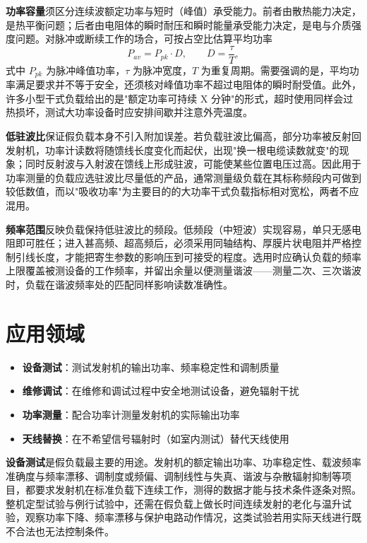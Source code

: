 \textbf{功率容量}须区分连续波额定功率与短时（峰值）承受能力。前者由散热能力决定，是热平衡问题；后者由电阻体的瞬时耐压和瞬时能量承受能力决定，是电与介质强度问题。对脉冲或断续工作的场合，可按占空比估算平均功率
\[
P_{av} = P_{pk} \cdot D, \qquad D = \frac{\tau}{T},
\]
式中 $P_{pk}$ 为脉冲峰值功率，$\tau$ 为脉冲宽度，$T$ 为重复周期。需要强调的是，平均功率满足要求并不等于安全，还须核对峰值功率不超过电阻体的瞬时耐受值。此外，许多小型干式负载给出的是"额定功率可持续 X 分钟"的形式，超时使用同样会过热损坏，测试大功率设备时应安排间歇并注意外壳温度。

\textbf{低驻波比}保证假负载本身不引入附加误差。若负载驻波比偏高，部分功率被反射回发射机，功率计读数将随馈线长度变化而起伏，出现"换一根电缆读数就变"的现象；同时反射波与入射波在馈线上形成驻波，可能使某些位置电压过高。因此用于功率测量的负载应选驻波比尽量低的产品，通常测量级负载在其标称频段内可做到较低数值，而以"吸收功率"为主要目的的大功率干式负载指标相对宽松，两者不应混用。

\textbf{频率范围}反映负载保持低驻波比的频段。低频段（中短波）实现容易，单只无感电阻即可胜任；进入甚高频、超高频后，必须采用同轴结构、厚膜片状电阻并严格控制引线长度，才能把寄生参数的影响压到可接受的程度。选用时应确认负载的频率上限覆盖被测设备的工作频率，并留出余量以便测量谐波——测量二次、三次谐波时，负载在谐波频率处的匹配同样影响读数准确性。

\section{应用领域}
\label{sec:dummy_load_applications}
\begin{itemize}
    \item \textbf{设备测试}：测试发射机的输出功率、频率稳定性和调制质量
    \item \textbf{维修调试}：在维修和调试过程中安全地测试设备，避免辐射干扰
    \item \textbf{功率测量}：配合功率计测量发射机的实际输出功率
    \item \textbf{天线替换}：在不希望信号辐射时（如室内测试）替代天线使用
\end{itemize}

\textbf{设备测试}是假负载最主要的用途。发射机的额定输出功率、功率稳定性、载波频率准确度与频率漂移、调制度或频偏、调制线性与失真、谐波与杂散辐射抑制等项目，都要求发射机在标准负载下连续工作，测得的数据才能与技术条件逐条对照。整机定型试验与例行试验中，还需在假负载上做长时间连续发射的老化与温升试验，观察功率下降、频率漂移与保护电路动作情况，这类试验若用实际天线进行既不合法也无法控制条件。

